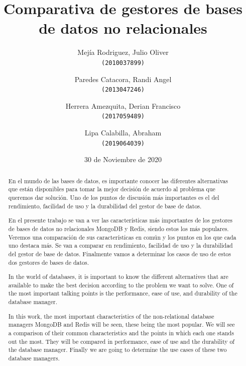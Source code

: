 \documentclass[twocolumn]{article}
\newenvironment{poliabstract}[1]
   {\renewcommand{\abstractname}{#1}\begin{abstract}}
   {\end{abstract}}
\begin{document}
\title{\Huge Comparativa de gestores de bases de datos no relacionales}
\author{
  Mejía Rodriguez, Julio Oliver\\
  \texttt{(2010037899)}
  \and
  Paredes Catacora, Randi Angel\\
  \texttt{(2013047246)}
  \and
  Herrera Amezquita, Derian Francisco\\
  \texttt{(2017059489)}
  \and
  Lipa Calabilla, Abraham\\
  \texttt{(2019064039)}
}
\date{30 de Noviembre de 2020}

\maketitle

\begin{poliabstract}{Resumen} 
  En el mundo de las bases de datos, es importante conocer las diferentes alternativas que están disponibles para tomar la mejor decisión de acuerdo al problema que queremos dar solución. Uno de los puntos de discusión más importantes es el del rendimiento, facilidad de uso y la durabilidad del gestor de base de datos.

  En el presente trabajo se van a ver las características más importantes de los gestores de bases de datos no relacionales MongoDB y Redis, siendo estos los más populares. Veremos una comparación de sus características en común y los puntos en los que cada uno destaca más. Se van a comparar en rendimiento, facilidad de uso y la durabilidad del gestor de base de datos. Finalmente vamos a determinar los casos de uso de estos dos gestores de bases de datos.
\end{poliabstract}

\begin{poliabstract}{Abstract} 
  In the world of databases, it is important to know the different alternatives that are available to make the best decision according to the problem we want to solve. One of the most important talking points is the performance, ease of use, and durability of the database manager.

  In this work, the most important characteristics of the non-relational database managers MongoDB and Redis will be seen, these being the most popular. We will see a comparison of their common characteristics and the points in which each one stands out the most. They will be compared in performance, ease of use and the durability of the database manager. Finally we are going to determine the use cases of these two database managers.
\end{poliabstract}
\end{document}
